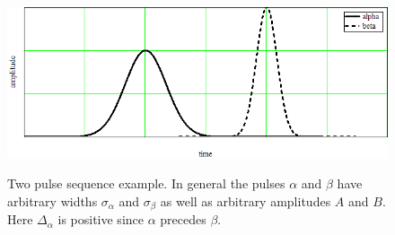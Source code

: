 \begin{figure}
\centering
\includegraphics[width=5.00in]
{2_pulses/2_pulses.png}\\
\caption[Two pulse sequence example]{Two pulse sequence example. In general the pulses $\alpha$ and $\beta$ have arbitrary widths $\sigma_\alpha$ and  $\sigma_\beta$ as well as arbitrary amplitudes $A$ and $B$. Here $\Delta_\alpha$ is positive since $\alpha$ precedes $\beta$.}
\label{2_pulses}
\end{figure} 
